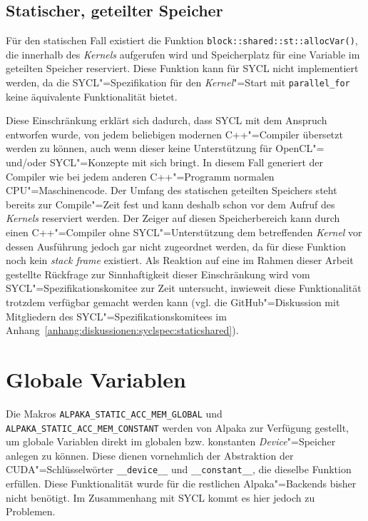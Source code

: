 \subsection{Statischer, geteilter Speicher}

Für den statischen Fall existiert die Funktion
\texttt{block::shared::st::allocVar()}, die innerhalb des \textit{Kernels} aufgerufen
wird und Speicherplatz für eine Variable im geteilten Speicher reserviert. Diese
Funktion kann für SYCL nicht implementiert werden, da die SYCL"=Spezifikation
für den \textit{Kernel}"=Start mit \texttt{parallel\_for} keine äquivalente
Funktionalität bietet.

Diese Einschränkung erklärt sich dadurch, dass SYCL mit dem Anspruch entworfen
wurde, von jedem beliebigen modernen C++"=Compiler übersetzt werden zu können,
auch wenn dieser keine Unterstützung für OpenCL"= und/oder SYCL"=Konzepte mit
sich bringt. In diesem Fall generiert der Compiler wie bei jedem anderen
C++"=Programm normalen CPU"=Maschinencode. Der Umfang des statischen geteilten
Speichers steht bereits zur Compile"=Zeit fest und kann deshalb schon vor
dem Aufruf des \textit{Kernels} reserviert werden. Der Zeiger auf diesen Speicherbereich
kann durch einen C++"=Compiler ohne SYCL"=Unterstützung dem betreffenden \textit{Kernel}
vor dessen Ausführung jedoch gar nicht zugeordnet werden, da für diese Funktion
noch kein \textit{stack frame} existiert. Als Reaktion auf eine im Rahmen dieser
Arbeit gestellte Rückfrage zur Sinnhaftigkeit dieser Einschränkung wird vom
SYCL"=Spezifikationskomitee zur Zeit untersucht, inwieweit diese Funktionalität
trotzdem verfügbar gemacht werden kann (vgl. die GitHub"=Diskussion mit
Mitgliedern des SYCL"=Spezifikationskomitees im
Anhang~\ref{anhang:diskussionen:syclspec:staticshared}).

\section{Globale Variablen}\label{implementierung:globalvar}

Die Makros \texttt{ALPAKA\_STATIC\_ACC\_MEM\_GLOBAL} und
\texttt{ALPAKA\_STATIC\_ACC\_MEM\_CONSTANT} werden von Alpaka zur Verfügung
gestellt, um globale Variablen direkt im globalen bzw. konstanten
\textit{Device}"=Speicher anlegen zu können. Diese dienen vornehmlich der
Abstraktion der CUDA"=Schlüsselwörter \texttt{\_\_device\_\_} und
\texttt{\_\_constant\_\_}, die dieselbe Funktion erfüllen. Diese Funktionalität
wurde für die restlichen Alpaka"=Backends bisher nicht benötigt. Im Zusammenhang
mit SYCL kommt es hier jedoch zu Problemen.

